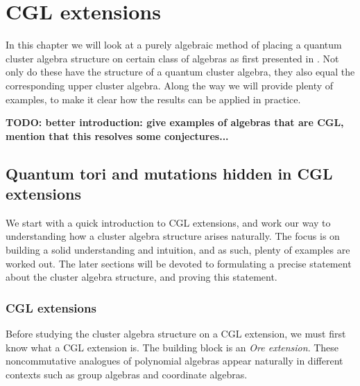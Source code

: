 \chapter{CGL extensions}

In this chapter we will look at a purely algebraic method of placing a quantum cluster
algebra structure on certain class of algebras as first presented in
\cite{GoodearlYakimov2017QCA}. Not only do these have the structure of a quantum
cluster algebra, they also equal the corresponding upper cluster algebra. Along the way
we will provide plenty of examples, to make it clear how the results can be applied in
practice.

\textbf{TODO: better introduction: give examples of algebras that are CGL, mention that this resolves some conjectures...}

\section{Quantum tori and mutations hidden in CGL extensions}\label{sec:cgl_introduction}

We start with a quick introduction to CGL extensions, and work our way to understanding
how a cluster algebra structure arises naturally. The focus is on building a solid
understanding and intuition, and as such, plenty of examples are worked out. The later
sections will be devoted to formulating a precise statement about the cluster algebra
structure, and proving this statement.

\subsection{CGL extensions}

Before studying the cluster algebra structure on a CGL extension, we must first know
what a CGL extension is. The building block is an \emph{Ore extension}. These
noncommutative analogues of polynomial algebras appear naturally in different contexts
such as group algebras and coordinate algebras.

